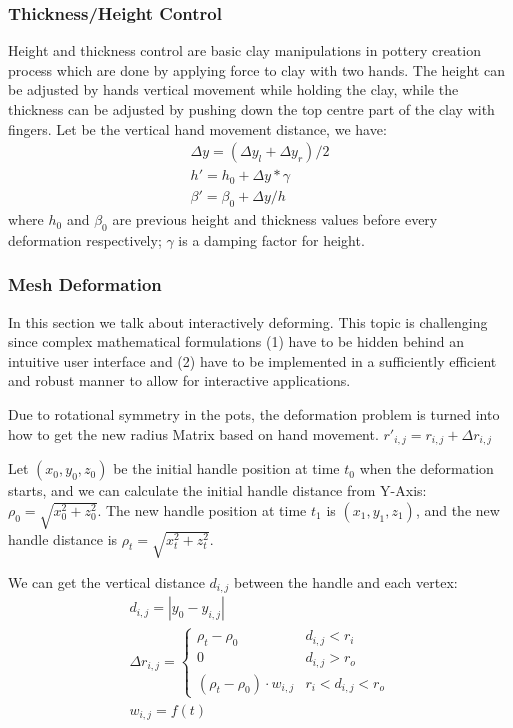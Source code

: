 \subsubsection{Thickness/Height Control}
\label{sec:4.2.2}
Height and thickness control are  basic clay manipulations in pottery creation process which are done by applying force to clay with two hands. The height can be adjusted by hands vertical movement while holding the clay, while the thickness can be adjusted by pushing down the top centre part of the clay with fingers. Let  be the vertical hand movement distance, we have:
\begin{equation}
\begin{split}
\Delta y = (\Delta y_{l} + \Delta y_{r})/2 \\
h' = h_{0} + \Delta y * \gamma \\
\beta' = \beta_{0} + \Delta y/ h
\end{split}
\end{equation}
where $h_{0}$ and $\beta_{0}$ are previous height and thickness values before every deformation respectively; $\gamma$ is a damping factor for height.

\subsubsection{Mesh Deformation}
\label{sec:4.2.3}
In this section we talk about interactively deforming. This topic is challenging since complex mathematical formulations (1) have to be hidden behind an intuitive user interface and (2) have to be implemented in a sufficiently efficient and robust manner to allow for interactive applications.\cite{botsch2010polygon}

Due to rotational symmetry in the pots, the deformation problem is turned into how to get the new radius Matrix based on hand movement. $r'_{i,j} = r_{i,j} + \Delta r_{i,j}$

Let $(x_{0},y_{0},z_{0})$ be the initial handle position at time $t_{0}$ when the deformation starts, and we can calculate the initial handle distance from Y-Axis: $\rho_{0} = \sqrt{x_{0}^2 + z_{0}^2}$. The new handle position at time $t_{1}$ is $(x_{1},y_{1},z_{1})$, and the new handle distance is $\rho_{t} = \sqrt{x_{t}^2 + z_{t}^2}$.

We can get the vertical distance $d_{i,j}$ between the handle and each vertex:
\begin{equation}
\begin{aligned}
d_{i,j} = |y_{0} - y_{i,j}| \\
\Delta r_{i,j} = \begin{cases}
\rho_{t} - \rho_{0} &  d_{i,j} < r_{i} \\
0 &  d_{i,j} > r_{o} \\
(\rho_{t} - \rho_{0}) \cdot w_{i,j} &  r_{i} < d_{i,j} < r_{o}
\end{cases} \\
w_{i,j} = f(t)
\end{aligned}
\end{equation}

